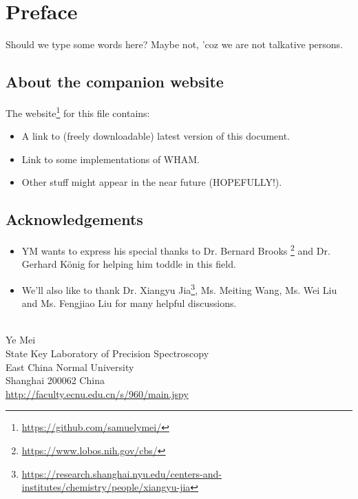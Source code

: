 \chapter*{Preface}
Should we type some words here? Maybe not, 'coz we are not talkative persons.

\section*{About the companion website}
The website\footnote{\url{https://github.com/samuelymei/}} for this file contains:
\begin{itemize}
  \item A link to (freely downloadable) latest version of this document.
  \item Link to some implementations of WHAM.
  \item Other stuff might appear in the near future (HOPEFULLY!).
\end{itemize}

\section*{Acknowledgements}
\begin{itemize}
\item YM wants to express his special thanks to Dr. Bernard Brooks \footnote{\url{https://www.lobos.nih.gov/cbs/}} and Dr. Gerhard K\"onig for helping him toddle in this field.
\item We'll also like to thank Dr. Xiangyu Jia\footnote{\url{https://research.shanghai.nyu.edu/centers-and-institutes/chemistry/people/xiangyu-jia}}, Ms. Meiting Wang, Ms. Wei Liu and Ms. Fengjiao Liu for many helpful discussions.
\end{itemize}
\mbox{}\\
\noindent Ye Mei \\
\noindent State Key Laboratory of Precision Spectroscopy\\
\noindent East China Normal University\\
\noindent Shanghai 200062 China\\
\noindent \url{http://faculty.ecnu.edu.cn/s/960/main.jspy}